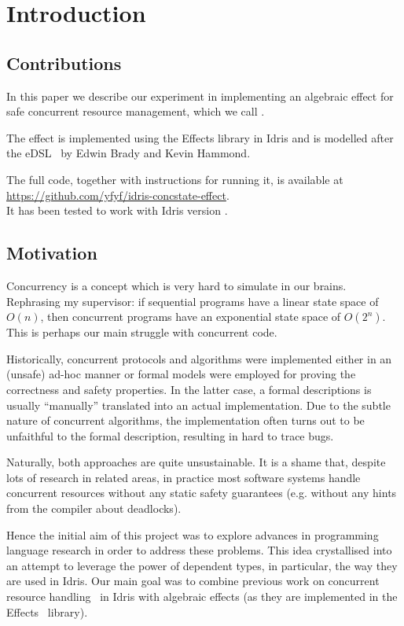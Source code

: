\section{Introduction}

\subsection{Contributions}

In this paper we describe our experiment in implementing an algebraic effect
for safe concurrent resource management, which we call .

The effect is implemented using the Effects library in Idris and is modelled
after the  eDSL~\cite{cbconc-fi} by Edwin Brady and Kevin
Hammond.

The full code, together with instructions for running it, is available at\\
\mbox{\url{https://github.com/yfyf/idris-concstate-effect}}.\\
It has been tested to work with Idris version \version.

\subsection{Motivation}

Concurrency is a concept which is very hard to simulate in our brains.
Rephrasing my supervisor: if sequential programs have a linear state space of
$O(n)$, then concurrent programs have an exponential state space of $O(2^n)$.
This is perhaps our main struggle with concurrent code.

Historically, concurrent protocols and algorithms were implemented either in an
(unsafe) ad-hoc manner or formal models were employed for proving the
correctness and safety properties. In the latter case, a formal descriptions
is usually ``manually'' translated into an actual implementation. Due to the
subtle nature of concurrent algorithms, the implementation often turns out to
be unfaithful to the formal description, resulting in hard to trace bugs.

Naturally, both approaches are quite unsustainable. It is a shame that, despite
lots of research in related areas, in practice most software systems handle
concurrent resources without any static safety guarantees (e.g. without any
hints from the compiler about deadlocks).

Hence the initial aim of this project was to explore advances in programming
language research in order to address these problems. This idea crystallised
into an attempt to leverage the power of dependent types, in particular, the
way they are used in Idris. Our main goal was to combine previous work on
concurrent resource handling~\cite{cbconc-fi} in Idris with algebraic effects
(as they are implemented in the Effects~\cite{effects-idr} library).

